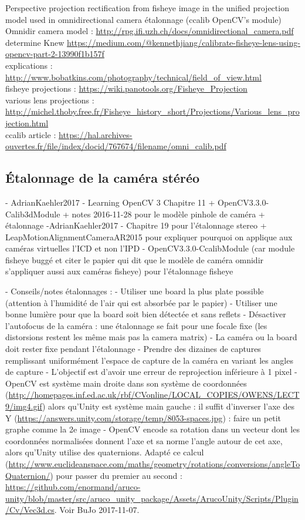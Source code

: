 Perspective projection rectification from fisheye image in the unified projection model used in omnidirectional camera étalonnage (ccalib OpenCV's module)\\
Omnidir camera model : \url{http://rpg.ifi.uzh.ch/docs/omnidirectional_camera.pdf}\\
determine Knew \url{https://medium.com/@kennethjiang/calibrate-fisheye-lens-using-opencv-part-2-13990f1b157f}\\
explications : \url{http://www.bobatkins.com/photography/technical/field_of_view.html}\\
fisheye projections : \url{https://wiki.panotools.org/Fisheye_Projection}\\
various lens projections : \url{http://michel.thoby.free.fr/Fisheye_history_short/Projections/Various_lens_projection.html}\\
ccalib article : \url{https://hal.archives-ouvertes.fr/file/index/docid/767674/filename/omni_calib.pdf}


\subsection{Étalonnage de la caméra stéréo}

- AdrianKaehler2017 - Learning OpenCV 3 Chapitre 11 + OpenCV3.3.0-Calib3dModule + notes 2016-11-28 pour le modèle pinhole de caméra + étalonnage
-AdrianKaehler2017 -  Chapitre 19 pour l'étalonnage stereo + LeapMotionAlignmentCameraAR2015 pour expliquer pourquoi on applique aux caméras virtuelles l'ICD et non l'IPD
- OpenCV3.3.0-CcalibModule (car module fisheye buggé et citer le papier qui dit que le modèle de caméra omnidir s'appliquer aussi aux caméras fisheye) pour l'étalonnage fisheye

- Conseils/notes étalonnages :
  - Utiliser une board la plus plate possible (attention à l'humidité de l'air qui est absorbée par le papier)
  - Utiliser une bonne lumière pour que la board soit bien détectée et sans reflets
  - Désactiver l'autofocus de la caméra : une étalonnage se fait pour une focale fixe (les distorsions restent les même mais pas la camera matrix)
  - La caméra ou la board doit rester fixe pendant l'étalonnage
  - Prendre des dizaines de captures remplissant uniformément l'espace de capture de la caméra en variant les angles de capture
  - L'objectif est d'avoir une erreur de reprojection inférieure à 1 pixel
  - OpenCV est système main droite dans son système de coordonnées (\url{http://homepages.inf.ed.ac.uk/rbf/CVonline/LOCAL_COPIES/OWENS/LECT9/img4.gif}) alors qu'Unity est système main gauche : il suffit d'inverser l'axe des Y (\url{https://answers.unity.com/storage/temp/8053-spaces.jpg}) : faire un petit graphe comme la 2e image
  - OpenCV encode sa rotation dans un vecteur dont les coordonnées normalisées donnent l'axe et sa norme l'angle autour de cet axe, alors qu'Unity utilise des quaternions. Adapté ce calcul (\url{http://www.euclideanspace.com/maths/geometry/rotations/conversions/angleToQuaternion/}) pour passer du premier au second : \url{https://github.com/enormand/aruco-unity/blob/master/src/aruco_unity_package/Assets/ArucoUnity/Scripts/Plugin/Cv/Vec3d.cs}. Voir BuJo 2017-11-07.

